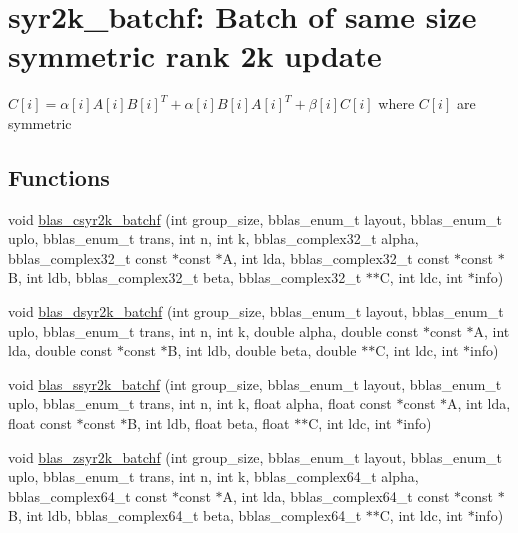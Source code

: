 \hypertarget{group__syr2k__batchf}{}\section{syr2k\+\_\+batchf\+: Batch of same size symmetric rank 2k update}
\label{group__syr2k__batchf}


$ C[i] = \alpha[i] A[i] B[i]^T + \alpha[i] B[i] A[i]^T + \beta[i] C[i] $ where $ C[i] $ are symmetric  


\subsection*{Functions}
\begin{DoxyCompactItemize}
\item 
void \hyperlink{group__syr2k__batchf_ga33099f6c30809ceab9949f8d8b49ba0d}{blas\+\_\+csyr2k\+\_\+batchf} (int group\+\_\+size, bblas\+\_\+enum\+\_\+t layout, bblas\+\_\+enum\+\_\+t uplo, bblas\+\_\+enum\+\_\+t trans, int n, int k, bblas\+\_\+complex32\+\_\+t alpha, bblas\+\_\+complex32\+\_\+t const $\ast$const $\ast$A, int lda, bblas\+\_\+complex32\+\_\+t const $\ast$const $\ast$B, int ldb, bblas\+\_\+complex32\+\_\+t beta, bblas\+\_\+complex32\+\_\+t $\ast$$\ast$C, int ldc, int $\ast$info)
\item 
void \hyperlink{group__syr2k__batchf_gab280fe015e82c196cc9c20811a4df110}{blas\+\_\+dsyr2k\+\_\+batchf} (int group\+\_\+size, bblas\+\_\+enum\+\_\+t layout, bblas\+\_\+enum\+\_\+t uplo, bblas\+\_\+enum\+\_\+t trans, int n, int k, double alpha, double const $\ast$const $\ast$A, int lda, double const $\ast$const $\ast$B, int ldb, double beta, double $\ast$$\ast$C, int ldc, int $\ast$info)
\item 
void \hyperlink{group__syr2k__batchf_ga675940b5ea241293de1b9b363efe05ff}{blas\+\_\+ssyr2k\+\_\+batchf} (int group\+\_\+size, bblas\+\_\+enum\+\_\+t layout, bblas\+\_\+enum\+\_\+t uplo, bblas\+\_\+enum\+\_\+t trans, int n, int k, float alpha, float const $\ast$const $\ast$A, int lda, float const $\ast$const $\ast$B, int ldb, float beta, float $\ast$$\ast$C, int ldc, int $\ast$info)
\item 
void \hyperlink{group__syr2k__batchf_ga0da6e0560c631981925ab9da59ef8d16}{blas\+\_\+zsyr2k\+\_\+batchf} (int group\+\_\+size, bblas\+\_\+enum\+\_\+t layout, bblas\+\_\+enum\+\_\+t uplo, bblas\+\_\+enum\+\_\+t trans, int n, int k, bblas\+\_\+complex64\+\_\+t alpha, bblas\+\_\+complex64\+\_\+t const $\ast$const $\ast$A, int lda, bblas\+\_\+complex64\+\_\+t const $\ast$const $\ast$B, int ldb, bblas\+\_\+complex64\+\_\+t beta, bblas\+\_\+complex64\+\_\+t $\ast$$\ast$C, int ldc, int $\ast$info)
\end{DoxyCompactItemize}


